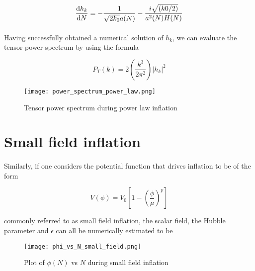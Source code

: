 \documentclass[12pt,a4paper,oneside]{book}
\begin{document}
\begin{equation}
\frac{{\rm d}h_k}{{\rm d}N} = -\frac{1}{\sqrt{2k_0}a(N)} - \frac{i\sqrt{(k0/2)}}{a^2(N)H(N)}
\end{equation}

\paragraph*{} Having successfully obtained a numerical solution of $h_k$, we can evaluate the tensor power spectrum by using the formula %

\begin{equation}
P_T(k) = 2 \left(\frac{k^3}{2\pi^2}\right) |h_k|^2
\end{equation}

\begin{figure}
\begin{center}
\texttt{[image: power\_spectrum\_power\_law.png]}
\caption[Tensor power spectrum during power law inflation]{Tensor power spectrum during power law inflation}
\end{center}
\end{figure}

\section{Small field inflation}

\paragraph*{} Similarly, if one considers the potential function that drives inflation to be of the form

\begin{equation}
V(\phi) = V_0\left[1-\left(\frac{\phi}{\mu}\right)^p\right]
\end{equation}

\noindent commonly referred to as small field inflation, the scalar field, the Hubble parameter and $\epsilon$ can all be numerically estimated to be

\begin{figure}
\begin{center}
\texttt{[image: phi\_vs\_N\_small\_field.png]}
\caption[Plot of $\phi(N)$ vs $N$ during small field inflation]{Plot of $\phi(N)$ vs $N$ during small field inflation}
\end{center}
\end{figure}
\end{document}
